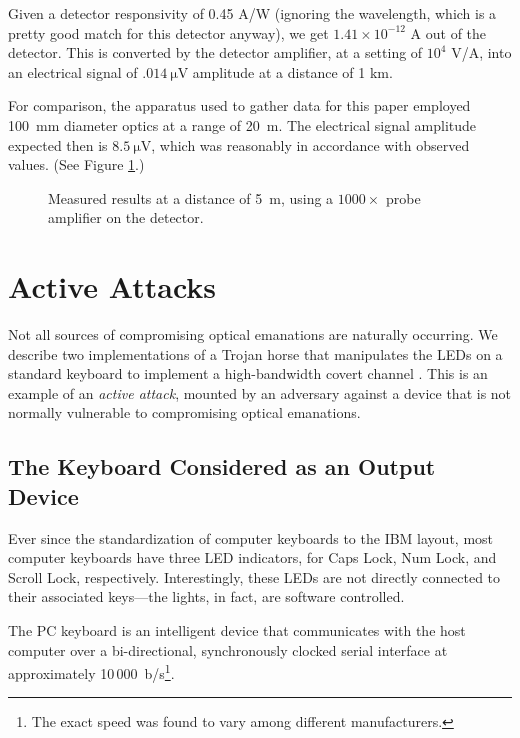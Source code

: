 \documentclass{acmtrans2e}
\begin{document}
Given a detector responsivity of
0.45 A/W (ignoring the wavelength, which is a pretty good match for this
detector anyway), we get $1.41 \times 10^{-12}$ A out of the detector.
This is converted by the detector amplifier, at a setting of $10^4$ V/A,
into an electrical signal of $.014 \ \mathrm{\mu V}$ amplitude at a distance
of 1 km.

For comparison, the apparatus used to gather data for this paper
employed 100~mm diameter optics at a range of 20~m.  The electrical
signal amplitude expected then is $8.5 \ \mathrm{\mu V}$, which was reasonably
in accordance with observed values.  (See Figure \ref{optical_power_figure}.)

\begin{figure}
\centering
\caption{Measured results at a distance of 5~m, using a $1000 \times$
probe amplifier on the detector.}
\label{optical_power_figure}
\end{figure}

\section{Active Attacks}\label{appendix:covert_channel}

Not all sources of compromising optical emanations are naturally 
occurring.  We describe two implementations of a Trojan horse that 
manipulates the LEDs on a standard keyboard to implement a
high-bandwidth covert channel \cite{wray}.  This is an example of an
{\it active attack}, mounted by an adversary against a device
that is
not normally vulnerable to compromising optical emanations.

\subsection{The Keyboard Considered as an Output Device}

Ever since the standardization of computer keyboards to the IBM layout, 
most computer keyboards have three LED indicators, for Caps Lock, 
Num Lock, and Scroll Lock, respectively.  Interestingly, these LEDs are
not directly connected to their associated keys---the lights, in fact,
are software controlled.

The PC keyboard is an intelligent device that communicates with the host 
computer over a bi-directional, synchronously clocked serial interface at 
approximately 10\,000~b/s\footnote{The exact speed was found 
to vary among different manufacturers.}.
\end{document}
